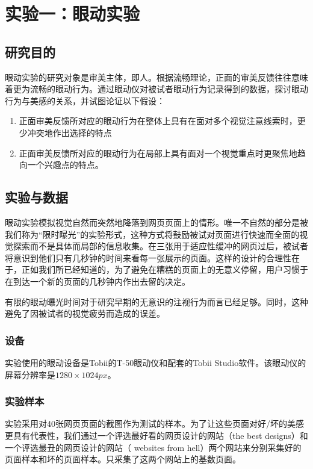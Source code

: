 \chapter{实验一：眼动实验}
\label{exp1}

\section{研究目的}
眼动实验的研究对象是审美主体，即人。根据流畅理论，正面的审美反馈往往意味着更为流畅的眼动行为。通过眼动仪对被试者眼动行为记录得到的数据，探讨眼动行为与美感的关系，并试图论证以下假设：

\begin{enumerate}
  \item 正面审美反馈所对应的眼动行为在整体上具有在面对多个视觉注意线索时，更少冲突地作出选择的特点
  \item 正面审美反馈所对应的眼动行为在局部上具有面对一个视觉重点时更聚焦地趋向一个兴趣点的特点。
\end{enumerate}

\section{实验与数据}
眼动实验模拟视觉自然而突然地降落到网页页面上的情形。唯一不自然的部分是被我们称为“限时曝光”的实验形式，这种方式将鼓励被试对页面进行快速而全面的视觉探索而不是具体而局部的信息收集。在三张用于适应性缓冲的网页过后，被试者将意识到他们只有几秒钟的时间来看每一张展示的页面。这样的设计的合理性在于，正如我们所已经知道的，为了避免在糟糕的页面上的无意义停留，用户习惯于在到达一个新的页面的几秒钟内作出去留的决定。

有限的眼动曝光时间对于研究早期的无意识的注视行为而言已经足够。同时，这种避免了因被试者的视觉疲劳而造成的误差。

\subsection{设备}
实验使用的眼动设备是Tobii的T-50眼动仪和配套的Tobii Studio软件。该眼动仪的屏幕分辨率是$1280\times1024px$。

\subsection{实验样本}
实验采用对40张网页页面的截图作为测试的样本。为了让这些页面对好/坏的美感更具有代表性，我们通过一个评选最好看的网页设计的网站（the best designs\footnotemark[1]）和一个评选最丑的网页设计的网站（ websites from hell\footnotemark[2]）两个网站来分别采集好的页面样本和坏的页面样本。只采集了这两个网站上的基数页面。

